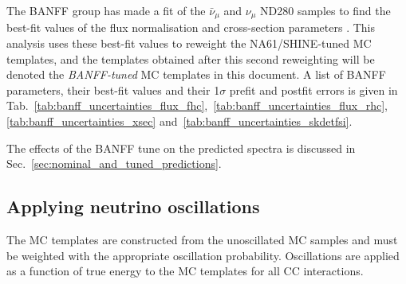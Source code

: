 The BANFF group has made a fit of the $\bar{\nu}_\mu$ and  $\nu_\mu$ 
ND280 samples 
to find the best-fit values of the flux normalisation and cross-section parameters \cite{BANFF2015}. This 
analysis uses these best-fit values to reweight the NA61/SHINE-tuned MC templates, and the templates obtained after this second 
reweighting will be denoted the {\em BANFF-tuned} MC templates in this document.
A list of BANFF parameters, their best-fit values and their 1$\sigma$ prefit and postfit errors is given in 
Tab.~\ref{tab:banff_uncertainties_flux_fhc},~\ref{tab:banff_uncertainties_flux_rhc},
\ref{tab:banff_uncertainties_xsec} and~\ref{tab:banff_uncertainties_skdetfsi}.

The effects of the BANFF tune on the predicted spectra is discussed 
in Sec.~\ref{sec:nominal_and_tuned_predictions}. 


\subsection{Applying neutrino oscillations}
\label{sec:applying_oscillations}

The MC templates are constructed from the unoscillated MC samples and must be weighted with the appropriate oscillation 
probability. Oscillations are applied as a function of true energy to the
  MC templates for all CC interactions.


